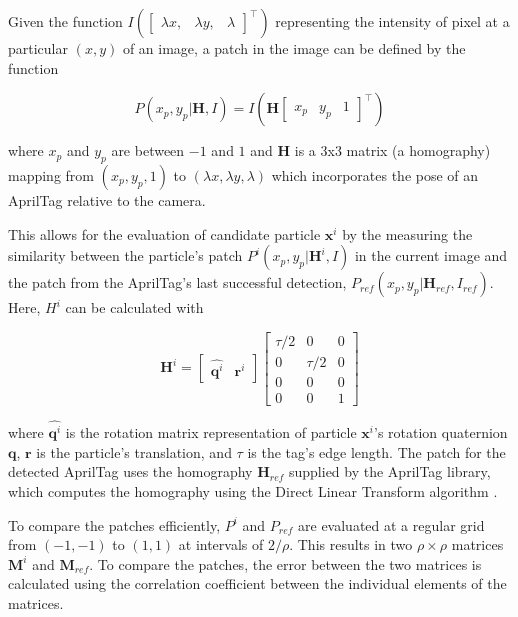 \documentclass[letterpaper, 10 pt, conference]{ieeeconf}
\renewcommand{\vec}[1]{\boldsymbol{#1}}
\begin{document}
Given the function $I(\begin{bmatrix} \lambda x, & \lambda y, & \lambda \end{bmatrix}^\intercal )$ representing the intensity of pixel at a particular $(x,y)$ of an image, a patch in the image can be defined by the function 

\begin{equation}
P(x_p,y_p| \vec{H}, I ) = I(\vec{H}  \begin{bmatrix} x_p & y_p & 1\end{bmatrix}^\intercal)
\end{equation}

where $x_p$ and $y_p$ are between $-1$ and $1$ and $\vec{H}$ is a 3x3 matrix (a homography) mapping from $(x_p, y_p, 1)$ to $(\lambda x, \lambda y, \lambda)$ which incorporates the pose of an AprilTag relative to the camera. 


This allows for the evaluation of candidate particle $\vec{x}^i$ by the measuring the similarity between the particle's patch $P^i(x_p,y_p|\vec{H}^i,I)$ in the current image and the patch from the AprilTag's last successful detection, $P_{ref}(x_p,y_p|\vec{H}_{ref},I_{ref})$. Here, $H^i$ can be calculated with

\begin{equation} \label{eq:particle_homography}
\vec{H}^i = \begin{bmatrix}
		\widehat{\vec{q}^i} & \vec{r}^i
	\end{bmatrix} \begin{bmatrix}
		\tau/2 & 0 & 0 \\
		0 & \tau/2 & 0 \\
		0 & 0 & 0 \\
		0 & 0 & 1
	\end{bmatrix}
\end{equation}



where $\widehat{\vec{q}^i}$ is the rotation matrix representation of particle $\vec{x}^i$'s rotation quaternion $\vec{q}$, $\vec{r}$ is the particle's translation, and $\tau$ is the tag's edge length. The patch for the detected AprilTag uses the homography $\vec{H}_{ref}$ supplied by the AprilTag library, which computes the homography using the Direct Linear Transform algorithm \citep{AprilTag}. 


To compare the patches efficiently, $P^i$ and $P_{ref}$ are evaluated at a regular grid from $(-1, -1)$ to $(1, 1)$ at intervals of $2 / \rho$. This results in two $\rho \times \rho$ matrices $\vec{M}^i$ and $\vec{M}_{ref}$. To compare the patches, the error between the two  matrices is calculated using the correlation coefficient between the individual elements of the matrices.
\end{document}
